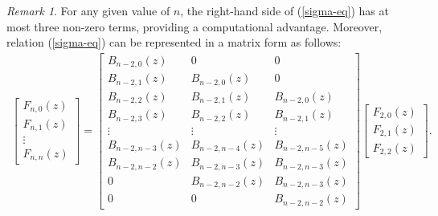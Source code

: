 \documentclass[preprint,12pt]{elsarticle}
\theoremstyle{definition}
\theoremstyle{theorem}
\theoremstyle{lemma}
\theoremstyle{example}
\theoremstyle{remark}
\newtheorem{remark}{Remark}
\theoremstyle{prop}
\begin{document}
\begin{remark}
For any given value of \(n\), the right-hand side of (\ref{sigma-eq}) has at most  three non-zero terms, providing a computational advantage. Moreover, relation (\ref{sigma-eq}) can be represented in a matrix form as follows:
\begin{eqnarray*}
 \begin{bmatrix}
F_{n,0}(z)\\ 
F_{n,1}(z)\\ 
\vdots \\
F_{n,n}(z)
\end{bmatrix}=
\begin{bmatrix}
B_{n-2,0}(z) & 0 &0 \\ 
B_{n-2,1}(z) & B_{n-2,0}(z) & 0 \\ 
B_{n-2,2}(z) & B_{n-2,1}(z) & B_{n-2,0}(z) \\ 
B_{n-2,3}(z) & B_{n-2,2}(z) & B_{n-2,1}(z)  \\ 
\vdots  &  \vdots & \vdots \\ 
B_{n-2,n-3}(z) & B_{n-2,n-4}(z)  & B_{n-2,n-5}(z) \\ 
B_{n-2,n-2}(z) & B_{n-2,n-3}(z)  & B_{n-2,n-3}(z) \\ 
0 & B_{n-2,n-2}(z) & B_{n-2,n-3}(z) \\ 
 0& 0 & B_{n-2,n-2}(z)
\end{bmatrix}%
\begin{bmatrix}
F_{2,0}(z)\\ 
F_{2,1}(z)\\ 
F_{2,2}(z)
\end{bmatrix}.%
\end{eqnarray*}
%
\end{remark}
\end{document}
